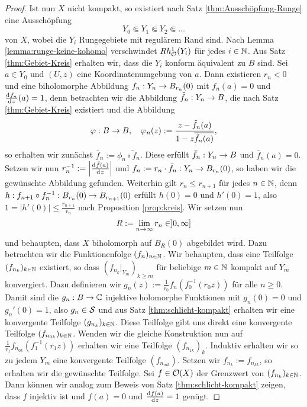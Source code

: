 \begin{proof}
  Ist nun $X$ nicht kompakt, so existiert nach Satz \ref{thm:Ausschöpfung-Runge}
  eine Ausschöpfung
  \[
  Y_0 \Subset Y_1 \Subset Y_2 \Subset \dots
  \]
  von $X$, wobei die $Y_i$ Rungegebiete mit regulärem Rand sind. 
  Nach Lemma \ref{lemma:runge-keine-kohomo} verschwindet
  $Rh_{\hol}^1(Y_i)$ für jedes $i \in \N$.
  Aus Satz \ref{thm:Gebiet-Kreis} erhalten wir, dass die $Y_i$
  konform äquivalent zu $B$ sind. 
  Sei $a \in Y_0$ und $(U,z)$ eine Koordinatenumgebung von $a$. Dann
  existieren $r_n <0$ und eine biholomorphe Abbildung $f_n: Y_n \ra
  B_{r_n}(0)$ mit $f_n(a) = 0$ und $\frac{\d[f_n]}{\d[z]}(a) = 1$, denn
  betrachten wir die Abbildung $\tilde f_n : Y_n \ra B$, die nach
  Satz \ref{thm:Gebiet-Kreis} existiert und die Abbildung
  \[
  \phi: B \ra B, \quad\phi_n(z) := \frac{z- \tilde f_n(a)}{1 - z \overline{\tilde
      f_n(a)}},
  \]
  so erhalten wir zunächst $\bar f_n := \phi_n \circ \tilde
  f_n$. Diese erfüllt $\bar f_n : Y_n \ra B$ und $\bar f_n(a) =
  0$. Setzen wir nun $r_n^{-1} := \left | \frac{\d[\bar f(a)]}{\d[z]}
  \right |$ und $f_n := r_n \cdot \bar f_n : Y_n \ra B_{r_n}(0)$, so
  haben wir die gewünschte Abbildung gefunden. 
  Weiterhin gilt $r_n \leq r_{n+1}$ für jedes $n \in \N$, denn $h:
  f_{n+1} \circ f_n^{-1} : B_{r_n}(0) \ra B_{r_{n+1}}(0)$ erfüllt $h(0)=0$
  und $h'(0) = 1$, also $1 = |h'(0)| \leq \frac{r_{n+1}}{r_n}$ nach
  Proposition \ref{prop:kreis}. 
  Wir setzen nun
  \[
  R := \lim_{n \ra \infty} r_n \in ]0, \infty]
  \]
  und behaupten, dass $X$ biholomorph auf $B_R(0)$ abgebildet wird. Dazu
  betrachten wir die Funktionenfolge $(f_n)_{n \in \N}$. Wir
  behaupten, dass eine Teilfolge $(f_{n_k})_{k \in \N}$ existiert,
  so dass $(f_{n_k}|_{Y_m})_{k \geq m}$ für beliebige $m \in \N$
  kompakt auf $Y_m$ konvergiert. 
  Dazu definieren wir $g_n(z) := \frac{1}{r_0} f_n(f_0^{-1}(r_0 z))$
  für alle $n \geq 0$. Damit sind die $g_n : B \ra \C$ injektive
  holomorphe Funktionen mit $g_n(0) = 0$ und $g_n'(0) = 1$, also
  $g_n \in \S$ und aus Satz \ref{thm:schlicht-kompakt}
  erhalten wir eine konvergente Teilfolge $(g_{n_k})_{k \in\N}$.
  Diese Teilfolge gibt uns direkt eine konvergente Teilfolge
  $(f_{n_{0k}})_{k\in\N}$.
  Wenden wir die gleiche Konstruktion nun auf
  $\frac{1}{r_1}f_{n_{0k}}(f_1^{-1}(r_1z))$ erhalten wir eine
  Teilfolge $(f_{n_{1k}})_k$. Induktiv erhalten wir so zu jedem $Y_m$
  eine konvergente Teilfolge $(f_{n_{mk}})$. 
  Setzen wir $f_{n_k} := f_{n_{kk}}$, so erhalten wir die gewünschte
  Teilfolge.
  Sei $f \in \hol(X)$ der Grenzwert von $(f_{n_k})_{k \in \N}$. Dann
  können wir analog zum Beweis von Satz \ref{thm:schlicht-kompakt}
  zeigen, dass $f$ injektiv ist und $f(a) = 0$ und
  $\frac{\d[f(a)]}{\d[z]} = 1$ genügt. 


\end{proof}
